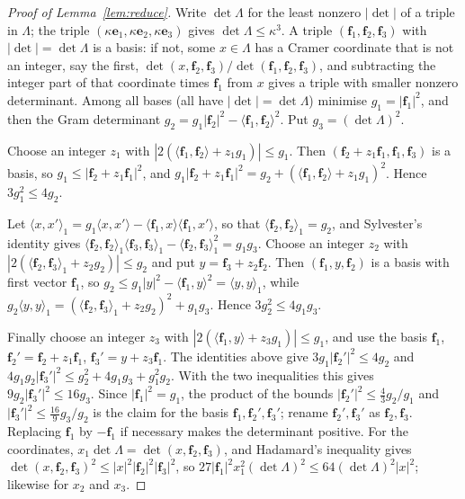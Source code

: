 \documentclass[11pt]{article}
\theoremstyle{definition}
\theoremstyle{remark}
\begin{document}
\begin{proof}[Proof of Lemma~\ref{lem:reduce}]
Write $\det\Lambda$ for the least nonzero $|\det|$ of a triple in $\Lambda$; the triple
$(\kappa\mathbf e_1,\kappa\mathbf e_2,\kappa\mathbf e_3)$ gives $\det\Lambda\le\kappa^3$. A triple
$(\mathbf f_1,\mathbf f_2,\mathbf f_3)$ with $|\det|=\det\Lambda$ is a basis: if not, some $x\in\Lambda$ has a Cramer
coordinate that is not an integer, say the first, $\det(x,\mathbf f_2,\mathbf f_3)/\det(\mathbf f_1,\mathbf f_2,
\mathbf f_3)$, and subtracting the integer part of that coordinate times $\mathbf f_1$ from $x$ gives a
triple with smaller nonzero determinant. Among all bases (all have $|\det|=\det\Lambda$) minimise
$g_1=|\mathbf f_1|^2$, and then the Gram determinant
$g_2=g_1|\mathbf f_2|^2-\langle\mathbf f_1,\mathbf f_2\rangle^2$. Put $g_3=(\det\Lambda)^2$.

Choose an integer $z_1$ with $|2(\langle\mathbf f_1,\mathbf f_2\rangle+z_1g_1)|\le g_1$. Then
$(\mathbf f_2+z_1\mathbf f_1,\mathbf f_1,\mathbf f_3)$ is a basis, so $g_1\le|\mathbf f_2+z_1\mathbf f_1|^2$, and
$g_1|\mathbf f_2+z_1\mathbf f_1|^2=g_2+(\langle\mathbf f_1,\mathbf f_2\rangle+z_1g_1)^2$. Hence
$3g_1^2\le4g_2$.

Let $\langle x,x'\rangle_1=g_1\langle x,x'\rangle-\langle\mathbf f_1,x\rangle\langle\mathbf f_1,x'\rangle$,
so that $\langle\mathbf f_2,\mathbf f_2\rangle_1=g_2$, and Sylvester's identity gives
$\langle\mathbf f_2,\mathbf f_2\rangle_1\langle\mathbf f_3,\mathbf f_3\rangle_1-\langle\mathbf f_2,\mathbf f_3\rangle_1^2
=g_1g_3$. Choose an integer $z_2$ with $|2(\langle\mathbf f_2,\mathbf f_3\rangle_1+z_2g_2)|\le g_2$ and
put $y=\mathbf f_3+z_2\mathbf f_2$. Then $(\mathbf f_1,y,\mathbf f_2)$ is a basis with first vector $\mathbf f_1$,
so $g_2\le g_1|y|^2-\langle\mathbf f_1,y\rangle^2=\langle y,y\rangle_1$, while
$g_2\langle y,y\rangle_1=(\langle\mathbf f_2,\mathbf f_3\rangle_1+z_2g_2)^2+g_1g_3$. Hence
$3g_2^2\le4g_1g_3$.

Finally choose an integer $z_3$ with $|2(\langle\mathbf f_1,y\rangle+z_3g_1)|\le g_1$, and use the
basis $\mathbf f_1$, $\mathbf f_2'=\mathbf f_2+z_1\mathbf f_1$, $\mathbf f_3'=y+z_3\mathbf f_1$. The identities above
give $3g_1|\mathbf f_2'|^2\le4g_2$ and
$4g_1g_2|\mathbf f_3'|^2\le g_2^2+4g_1g_3+g_1^2g_2$. With the two inequalities this gives
$9g_2|\mathbf f_3'|^2\le16g_3$. Since $|\mathbf f_1|^2=g_1$, the product of the bounds
$|\mathbf f_2'|^2\le\frac43g_2/g_1$ and $|\mathbf f_3'|^2\le\frac{16}9g_3/g_2$ is the claim for the
basis $\mathbf f_1,\mathbf f_2',\mathbf f_3'$; rename $\mathbf f_2',\mathbf f_3'$ as $\mathbf f_2,\mathbf f_3$.
Replacing $\mathbf f_1$ by $-\mathbf f_1$ if necessary makes the determinant positive. For the
coordinates, $x_1\det\Lambda=\det(x,\mathbf f_2,\mathbf f_3)$, and Hadamard's inequality gives
$\det(x,\mathbf f_2,\mathbf f_3)^2\le|x|^2|\mathbf f_2|^2|\mathbf f_3|^2$, so
$27|\mathbf f_1|^2x_1^2(\det\Lambda)^2\le64(\det\Lambda)^2|x|^2$; likewise for $x_2$ and $x_3$.
\end{proof}
\end{document}
